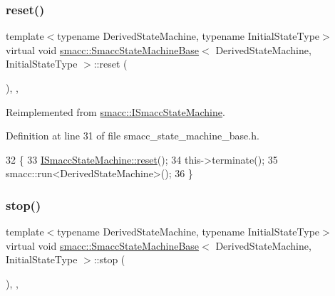 \subsubsection{\texorpdfstring{reset()}{reset()}}
{\footnotesize\ttfamily template$<$typename Derived\+State\+Machine, typename Initial\+State\+Type$>$ \\
virtual void \hyperlink{structsmacc_1_1SmaccStateMachineBase}{smacc\+::\+Smacc\+State\+Machine\+Base}$<$ Derived\+State\+Machine, Initial\+State\+Type $>$\+::reset (\begin{DoxyParamCaption}{ }\end{DoxyParamCaption})\hspace{0.3cm}{\ttfamily [inline]}, {\ttfamily [override]}, {\ttfamily [virtual]}}



Reimplemented from \hyperlink{classsmacc_1_1ISmaccStateMachine_a9e4b4fe4dda962642397993235c6eea0}{smacc\+::\+I\+Smacc\+State\+Machine}.



Definition at line 31 of file smacc\+\_\+state\+\_\+machine\+\_\+base.\+h.


\begin{DoxyCode}
32     \{
33         \hyperlink{classsmacc_1_1ISmaccStateMachine_a9e4b4fe4dda962642397993235c6eea0}{ISmaccStateMachine::reset}();
34         this->terminate();
35         smacc::run<DerivedStateMachine>();
36     \}
\end{DoxyCode}
\mbox{\label{structsmacc_1_1SmaccStateMachineBase_aaa9baa888888165998aa990ca299e30b}} 
\subsubsection{\texorpdfstring{stop()}{stop()}}
{\footnotesize\ttfamily template$<$typename Derived\+State\+Machine, typename Initial\+State\+Type$>$ \\
virtual void \hyperlink{structsmacc_1_1SmaccStateMachineBase}{smacc\+::\+Smacc\+State\+Machine\+Base}$<$ Derived\+State\+Machine, Initial\+State\+Type $>$\+::stop (\begin{DoxyParamCaption}{ }\end{DoxyParamCaption})\hspace{0.3cm}{\ttfamily [inline]}, {\ttfamily [override]}, {\ttfamily [virtual]}}



